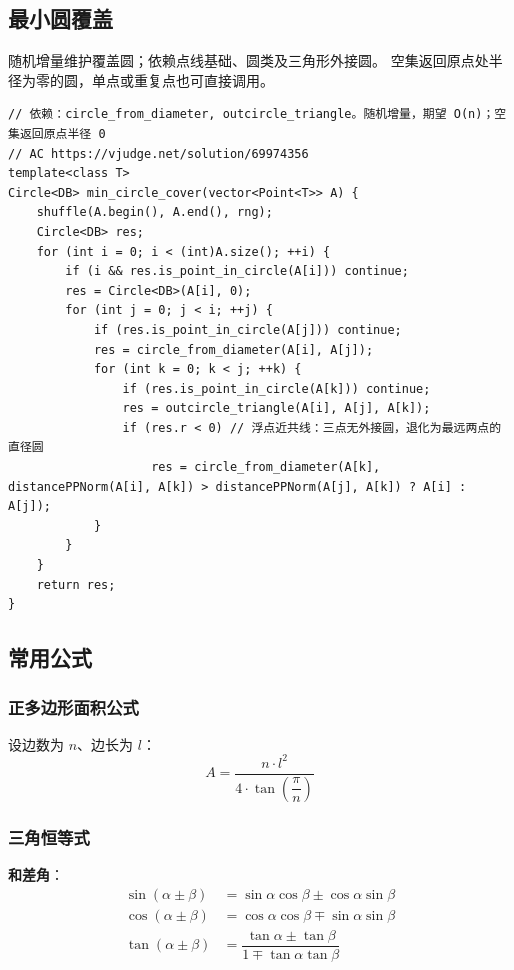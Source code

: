	\subsection{最小圆覆盖}
	随机增量维护覆盖圆；依赖点线基础、圆类及三角形外接圆。
	空集返回原点处半径为零的圆，单点或重复点也可直接调用。

\begin{verbatim}
// 依赖：circle_from_diameter, outcircle_triangle。随机增量，期望 O(n)；空集返回原点半径 0
// AC https://vjudge.net/solution/69974356
template<class T>
Circle<DB> min_circle_cover(vector<Point<T>> A) {
	shuffle(A.begin(), A.end(), rng);
	Circle<DB> res;
	for (int i = 0; i < (int)A.size(); ++i) {
		if (i && res.is_point_in_circle(A[i])) continue;
		res = Circle<DB>(A[i], 0);
		for (int j = 0; j < i; ++j) {
			if (res.is_point_in_circle(A[j])) continue;
			res = circle_from_diameter(A[i], A[j]);
			for (int k = 0; k < j; ++k) {
				if (res.is_point_in_circle(A[k])) continue;
				res = outcircle_triangle(A[i], A[j], A[k]);
				if (res.r < 0) // 浮点近共线：三点无外接圆，退化为最远两点的直径圆
					res = circle_from_diameter(A[k], distancePPNorm(A[i], A[k]) > distancePPNorm(A[j], A[k]) ? A[i] : A[j]);
			}
		}
	}
	return res;
}
\end{verbatim}

	\subsection{常用公式}

	\subsubsection{正多边形面积公式}

	设边数为 $n$、边长为 $l$：
	$$
	A = \dfrac{n \cdot l^2}{4 \cdot \tan\!\left(\dfrac{\pi}{n}\right)}
	$$

	\subsubsection{三角恒等式}

	\textbf{和差角}：
	\begin{align*}
		\sin(\alpha \pm \beta) & = \sin\alpha\cos\beta \pm \cos\alpha\sin\beta                                  \\
		\cos(\alpha \pm \beta) & = \cos\alpha\cos\beta \mp \sin\alpha\sin\beta                                  \\
		\tan(\alpha \pm \beta) & = \dfrac{\tan\alpha \pm \tan\beta}{1 \mp \tan\alpha\tan\beta}
	\end{align*}

